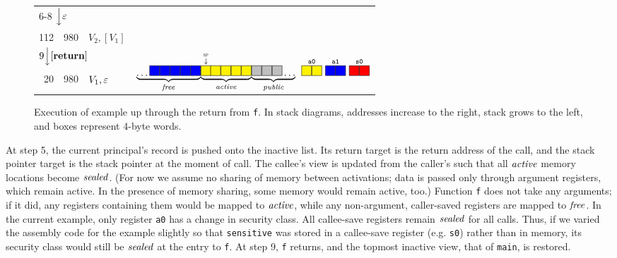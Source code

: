 \documentclass[10pt,conference]{ieeetran}%
\theoremstyle{definition}
\begin{document}
\begin{figure*}
\begin{tabular}{|r|r||l|r}
    \cline{1-3}
    \multicolumn{3}{l}{\multirow{2}{*}{6-8 \(\Big\downarrow \varepsilon\)}} \\ \multicolumn{3}{l}{} \\
    \cline{1-3}
    112 & 980 & \(V_2,[V_1]\) \\
    \cline{1-3}
    \multicolumn{3}{l}{\multirow{2}{*}{\(9 \Big\downarrow [\mathbf{return}]\)}} & \\
    \multicolumn{3}{l}{} & \multirow{3}{*}{\(\underbrace{\dots \freebox \freebox \freebox \freebox \freebox}_\unsealed
      \! \underbrace{\stackrel{\stackrel{\SP}{\downarrow}}{\objbox} \!\! \objbox \objbox \objbox \objbox}_\object
      \! \underbrace{\pubbox \pubbox \pubbox \dots}_\public
      ~ \stackrel{\mathtt{a0}}{\objbox\objbox} ~ \stackrel{\mathtt{a1}}{\freebox\freebox}
      ~ \stackrel{\mathtt{s0}}{\sealbox\sealbox}
      \)}
    \\
    \cline{1-3}
    20 & 980  & \(V_1, \varepsilon\) &
    \\
    \cline{1-3}
    \multicolumn{2}{l}{} \\
  \end{tabular}
  \caption{Execution of example up through the return from {\tt f}. In stack diagrams, addresses increase to the right, stack grows to the left, and boxes represent 4-byte words.}
\label{fig:exec1}
\end{figure*}
%
At step 5, the current principal's record is pushed onto the inactive list.
Its return target is the return address of the call,
and the stack pointer target is the stack pointer at the moment of call.
The callee's view is updated from the caller's such that all \(\mathit{active}\) memory locations
become \(\mathit{sealed}\). (For now we assume no sharing of memory between activations; data is
passed only through argument registers, which remain active. In the presence of memory
sharing, some memory would remain active, too.)
Function {\tt f} does not take any arguments; if it did, any registers containing them would be 
mapped to \(\mathit{active}\), while any non-argument, caller-saved 
registers are mapped to \(\mathit{free}\). In the current example, only register {\tt a0} has a change in
security class. All callee-save registers remain \(\mathit{sealed}\) for all calls.
Thus, if we varied the assembly code for the example slightly so that {\tt sensitive} was stored
in a callee-save register (e.g. {\tt s0}) rather than in memory, its security class would still be \(\mathit{sealed}\)
at the entry to {\tt f}.
%
At step 9, {\tt f} returns, and the topmost inactive view, that of {\tt main}, is restored.
\end{document}
